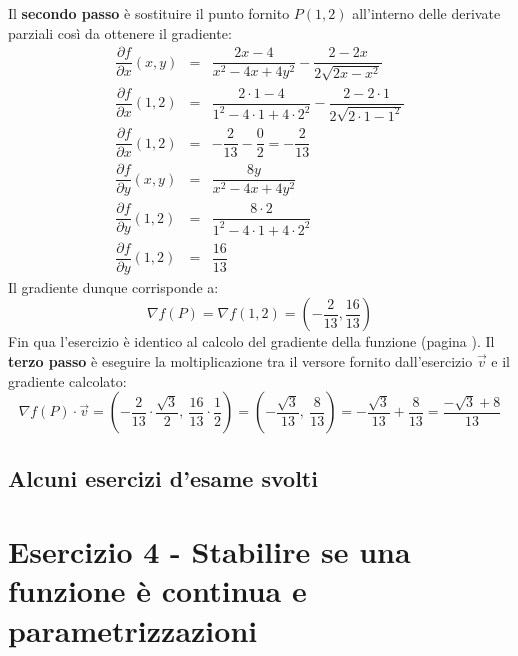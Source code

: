 \documentclass[a4paper]{article}
\begin{document}
	\noindent
	Il \textbf{secondo passo} è sostituire il punto fornito $P\left(1,2\right)$ all'interno delle derivate parziali così da ottenere il gradiente:
	\begin{equation*}
		\begin{array}{rcl}
			\dfrac{\partial f}{\partial x}\left(x,y\right) &=& \dfrac{2x - 4}{x^{2}-4x+4y^{2}} - \dfrac{2-2x}{2\sqrt{2x-x^{2}}} \\ [1.5em]
			\dfrac{\partial f}{\partial x}\left(1,2\right) &=& \dfrac{2 \cdot 1 - 4}{1^{2}-4 \cdot 1+4 \cdot 2^{2}} - \dfrac{2-2 \cdot 1}{2\sqrt{2 \cdot 1- 1^{2}}} \\ [1.5em]
			\dfrac{\partial f}{\partial x}\left(1,2\right) &=& -\dfrac{2}{13} - \dfrac{0}{2} = -\dfrac{2}{13} \\ [2.5em]
			\dfrac{\partial f}{\partial y}\left(x,y\right) &=& \dfrac{8y}{x^{2} - 4x + 4y^{2}} \\ [1.5em]
			\dfrac{\partial f}{\partial y}\left(1,2\right) &=& \dfrac{8 \cdot 2}{1^{2} - 4 \cdot 1 + 4 \cdot 2^{2}} \\ [1.5em]
			\dfrac{\partial f}{\partial y}\left(1,2\right) &=& \dfrac{16}{13}
		\end{array}
	\end{equation*}
	Il gradiente dunque corrisponde a:
	\begin{equation*}
		\nabla f\left(P\right) = \nabla f\left(1,2\right) = \left(-\dfrac{2}{13}, \dfrac{16}{13}\right)
	\end{equation*}
	Fin qua l'esercizio è identico al calcolo del gradiente della funzione (pagina \pageref{par: calcolare il gradiente della funzione}). Il \textbf{terzo passo} è eseguire la moltiplicazione tra il versore fornito dall'esercizio $\overrightarrow{v}$ e il gradiente calcolato:
	\begin{equation*}
		\nabla f\left(P\right) \cdot \overrightarrow{v} = \left(-\dfrac{2}{13} \cdot \dfrac{\sqrt{3}}{2}, \: \dfrac{16}{13} \cdot \dfrac{1}{2}\right) = \left(-\dfrac{\sqrt{3}}{13}, \: \dfrac{8}{13}\right) = -\dfrac{\sqrt{3}}{13} + \dfrac{8}{13} = \dfrac{-\sqrt{3} + 8}{13}
	\end{equation*}\newpage

	\subsection{Alcuni esercizi d'esame svolti}\newpage

	\section{Esercizio 4 - Stabilire se una funzione è continua e parametrizzazioni}
\end{document}
